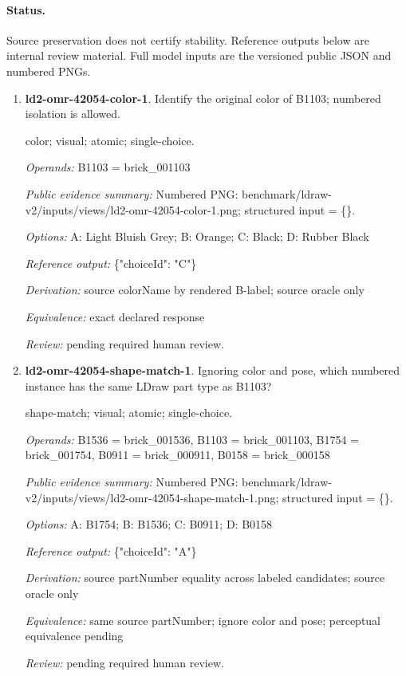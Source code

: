 \paragraph{Status.}Source preservation does not certify stability. Reference outputs below are internal review material. Full model inputs are the versioned public JSON and numbered PNGs.
\begin{enumerate}
\item \textbf{ld2-omr-42054-color-1}. Identify the original color of B1103; numbered isolation is allowed.
\par{\small color; visual; atomic; single-choice.\par\textit{Operands:} B1103 = brick\_001103\par\textit{Public evidence summary:} Numbered PNG: benchmark/ldraw-v2/inputs/views/ld2-omr-42054-color-1.png; structured input = \{\}.\par\textit{Options:} A: Light Bluish Grey; B: Orange; C: Black; D: Rubber Black\par\textit{Reference output:} \{"choiceId": "C"\}\par\textit{Derivation:} source colorName by rendered B-label; source oracle only\par\textit{Equivalence:} exact declared response\par\textit{Review:} pending required human review.}
\item \textbf{ld2-omr-42054-shape-match-1}. Ignoring color and pose, which numbered instance has the same LDraw part type as B1103?
\par{\small shape-match; visual; atomic; single-choice.\par\textit{Operands:} B1536 = brick\_001536, B1103 = brick\_001103, B1754 = brick\_001754, B0911 = brick\_000911, B0158 = brick\_000158\par\textit{Public evidence summary:} Numbered PNG: benchmark/ldraw-v2/inputs/views/ld2-omr-42054-shape-match-1.png; structured input = \{\}.\par\textit{Options:} A: B1754; B: B1536; C: B0911; D: B0158\par\textit{Reference output:} \{"choiceId": "A"\}\par\textit{Derivation:} source partNumber equality across labeled candidates; source oracle only\par\textit{Equivalence:} same source partNumber; ignore color and pose; perceptual equivalence pending\par\textit{Review:} pending required human review.}

\end{enumerate}
